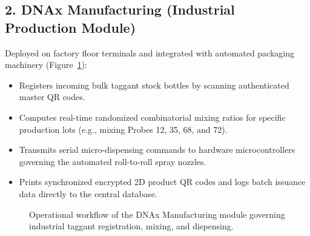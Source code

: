 \subsection{2. DNAx Manufacturing\textsuperscript{\textcopyright} (Industrial Production Module)}
Deployed on factory floor terminals and integrated with automated packaging machinery (Figure~\ref{fig:mfg_flow}):
\begin{itemize}
    \item Registers incoming bulk taggant stock bottles by scanning authenticated master QR codes.
    \item Computes real-time randomized combinatorial mixing ratios for specific production lots (e.g., mixing Probes 12, 35, 68, and 72).
    \item Transmits serial micro-dispensing commands to hardware microcontrollers governing the automated roll-to-roll spray nozzles.
    \item Prints synchronized encrypted 2D product QR codes and logs batch issuance data directly to the central database.
\end{itemize}

\begin{figure}[H]
    \centering
    \caption{Operational workflow of the DNAx Manufacturing module governing industrial taggant registration, mixing, and dispensing.}
    \label{fig:mfg_flow}
\end{figure}

